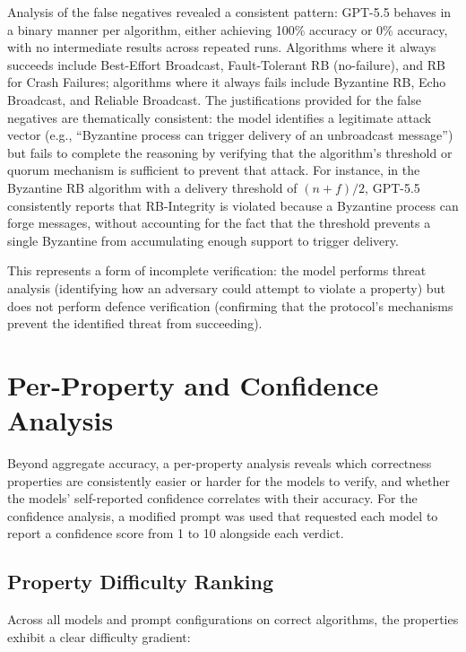 Analysis of the false negatives revealed a consistent pattern: GPT-5.5 behaves in a binary manner per algorithm, either achieving 100\% accuracy or 0\% accuracy, with no intermediate results across repeated runs. Algorithms where it always succeeds include Best-Effort Broadcast, Fault-Tolerant RB (no-failure), and RB for Crash Failures; algorithms where it always fails include Byzantine RB, Echo Broadcast, and Reliable Broadcast. The justifications provided for the false negatives are thematically consistent: the model identifies a legitimate attack vector (e.g., ``Byzantine process can trigger delivery of an unbroadcast message'') but fails to complete the reasoning by verifying that the algorithm's threshold or quorum mechanism is sufficient to prevent that attack. For instance, in the Byzantine RB algorithm with a delivery threshold of $(n+f)/2$, GPT-5.5 consistently reports that RB-Integrity is violated because a Byzantine process can forge messages, without accounting for the fact that the threshold prevents a single Byzantine from accumulating enough support to trigger delivery.

This represents a form of incomplete verification: the model performs threat analysis (identifying how an adversary could attempt to violate a property) but does not perform defence verification (confirming that the protocol's mechanisms prevent the identified threat from succeeding).

\section{Per-Property and Confidence Analysis}

Beyond aggregate accuracy, a per-property analysis reveals which correctness properties are consistently easier or harder for the models to verify, and whether the models' self-reported confidence correlates with their accuracy. For the confidence analysis, a modified prompt was used that requested each model to report a confidence score from 1 to 10 alongside each verdict.

\subsection{Property Difficulty Ranking}

Across all models and prompt configurations on correct algorithms, the properties exhibit a clear difficulty gradient:

